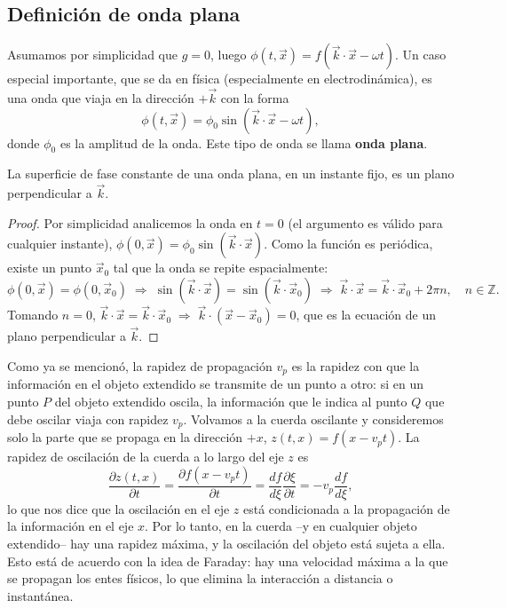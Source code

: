 \subsection{Definición de onda plana}

Asumamos por simplicidad que $g=0$, luego $\phi(t,\vec x) = f(\vec
k\cdot\vec x-\omega t)$. Un caso especial importante, que se da en
física (especialmente en electrodinámica), es una onda que viaja en la
dirección $+\vec k$ con la forma
\[
\phi(t,\vec x) = \phi_0\sin(\vec k\cdot\vec x - \omega t),
\]
donde $\phi_0$ es la amplitud de la onda. Este tipo de onda se llama
\textbf{onda plana}.

\begin{proposicionc}
La superficie de fase constante de una onda plana, en un instante fijo,
es un plano perpendicular a $\vec k$.
\end{proposicionc}

\begin{proof}
Por simplicidad analicemos la onda en $t=0$ (el argumento es válido para
cualquier instante), $\phi(0,\vec x) = \phi_0\sin(\vec k\cdot\vec x)$.
Como la función es periódica, existe un punto $\vec x_0$ tal que la onda
se repite espacialmente:
\[
\phi(0,\vec x) = \phi(0,\vec x_0) \;\Longrightarrow\; \sin(\vec
k\cdot\vec x) = \sin(\vec k\cdot\vec x_0) \;\Longrightarrow\; \vec
k\cdot\vec x = \vec k\cdot\vec x_0 + 2\pi n, \quad n\in\mathbb{Z}.
\]
Tomando $n=0$, $\vec k\cdot\vec x = \vec k\cdot\vec x_0
\;\Longrightarrow\; \vec k\cdot(\vec x-\vec x_0) = 0$, que es la
ecuación de un plano perpendicular a $\vec k$. \qedhere
\end{proof}

Como ya se mencionó, la rapidez de propagación $v_p$ es la rapidez con
que la información en el objeto extendido se transmite de un punto a
otro: si en un punto $P$ del objeto extendido oscila, la información que
le indica al punto $Q$ que debe oscilar viaja con rapidez $v_p$.
Volvamos a la cuerda oscilante y consideremos solo la parte que se
propaga en la dirección $+x$, $z(t,x)=f(x-v_pt)$. La rapidez de
oscilación de la cuerda a lo largo del eje $z$ es
\[
\frac{\partial z(t,x)}{\partial t} = \frac{\partial f(x-v_pt)}{\partial
t} = \frac{df}{d\xi}\frac{\partial\xi}{\partial t} = -v_p\frac{df}
{d\xi},
\]
lo que nos dice que la oscilación en el eje $z$ está condicionada a la
propagación de la información en el eje $x$. Por lo tanto, en la cuerda
--y en cualquier objeto extendido-- hay una rapidez máxima, y la
oscilación del objeto está sujeta a ella. Esto está de acuerdo con la
idea de Faraday: hay una velocidad máxima a la que se propagan los entes
físicos, lo que elimina la interacción a distancia o instantánea.

